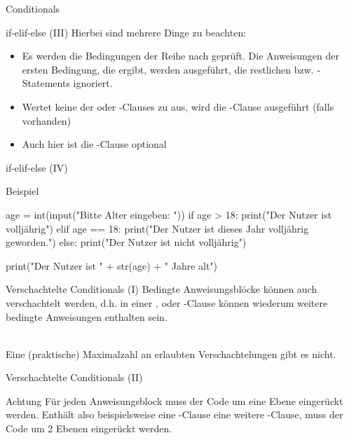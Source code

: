 \begin{subsection}{Conditionals}
\begin{frame}[fragile]{if-elif-else (III)}
            Hierbei sind mehrere Dinge zu beachten:
            
            \begin{itemize}
                \item Es werden die Bedingungen der Reihe nach geprüft. Die Anweisungen der ersten Bedingung, die  ergibt, werden ausgeführt, die restlichen  bzw. -Statements ignoriert.
                \item Wertet keine der  oder -Clauses zu  aus, wird die -Clause ausgeführt (falls vorhanden)
                \item Auch hier ist die -Clause optional
            \end{itemize}
        
        \end{frame}
        
        \begin{frame}[fragile]{if-elif-else (IV)}
            
            \begin{exampleblock}{Beispiel}
            
\begin{pythoncode}
age = int(input("Bitte Alter eingeben: "))
if age > 18:
    print("Der Nutzer ist volljährig")
elif age == 18:
    print("Der Nutzer ist dieses Jahr volljährig geworden.")
else: 
    print("Der Nutzer ist nicht volljährig")

print("Der Nutzer ist " + str(age) + " Jahre alt")
\end{pythoncode}

            \end{exampleblock}
        \end{frame}
        
        \begin{frame}{Verschachtelte Conditionals (I)}
            Bedingte Anweisungsblöcke können auch verschachtelt werden, d.h. in einer ,  oder -Clause können wiederum weitere bedingte Anweisungen enthalten sein.  \\~\
            
            Eine (praktische) Maximalzahl an erlaubten Verschachtelungen gibt es nicht.
            
        \end{frame}
        
        \begin{frame}{Verschachtelte Conditionals (II)}
            \begin{alertblock}{Achtung}
                Für jeden Anweisungsblock muss der Code um eine Ebene eingerückt werden. Enthält also beispielsweise eine -Clause eine weitere -Clause, muss der Code um 2 Ebenen eingerückt werden.
            \end{alertblock}
        \end{frame}
        

\end{subsection}
